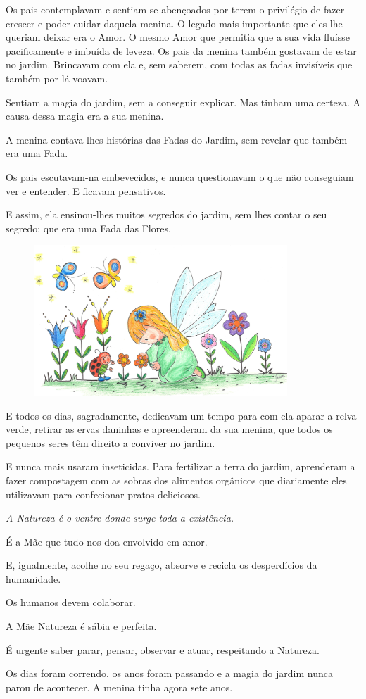 \documentclass[12pt, a4paper, twoside]{memoir}
\begin{document}
Os pais contemplavam e sentiam-se abençoados por terem o privilégio de fazer crescer e poder cuidar daquela menina.
O legado mais importante que eles lhe queriam deixar era o Amor.
O mesmo Amor que permitia que a sua vida fluísse pacificamente e imbuída de leveza.
\bigbreak
Os pais da menina também gostavam de estar no jardim. Brincavam com ela e, sem saberem, com todas as fadas invisíveis que também por lá voavam.

Sentiam a magia do jardim, sem a conseguir explicar.
Mas tinham uma certeza. A causa dessa magia era a sua menina.

A menina contava-lhes histórias das Fadas do Jardim, sem revelar que também era uma Fada.

Os pais escutavam-na embevecidos, e nunca questionavam o que não conseguiam ver e entender. E ficavam pensativos.

E assim, ela ensinou-lhes muitos segredos do jardim, sem lhes contar o seu segredo: que era uma Fada das Flores.

\begin{figure}[h]
    \centering
    \includegraphics[width=0.85\textwidth]{cuidando_das_flores}
\end{figure}

E todos os dias, sagradamente, dedicavam um tempo para com ela aparar a relva verde, retirar as ervas daninhas e apreenderam da sua menina, que todos os pequenos seres têm direito a conviver no jardim.

E nunca mais usaram inseticidas. Para fertilizar a terra do jardim, aprenderam a fazer compostagem com as sobras dos alimentos orgânicos que diariamente eles utilizavam para confecionar pratos deliciosos.
\bigbreak
{\itshape
A Natureza é o ventre donde surge toda a existência.

É a Mãe que tudo nos doa envolvido em amor.

E, igualmente, acolhe no seu regaço, absorve e recicla os desperdícios da humanidade.

Os humanos devem colaborar.

A Mãe Natureza é sábia e perfeita.

É urgente saber parar, pensar, observar e atuar, respeitando a Natureza.
}
\bigbreak
Os dias foram correndo, os anos foram passando e a magia do jardim nunca parou de acontecer.
\newpage
A menina tinha agora sete anos.
\end{document}
